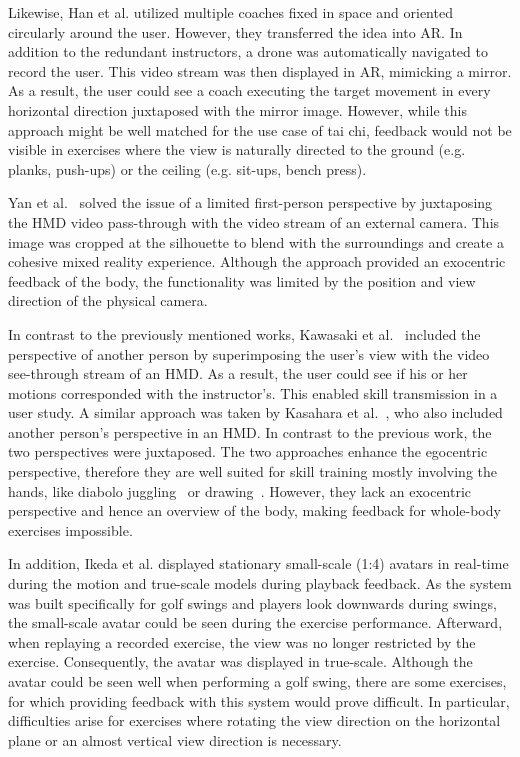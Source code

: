 Likewise, Han et al.\cite{han2017mtc} utilized multiple coaches fixed in space and oriented circularly around the user. However, they transferred the idea into AR. In addition to the redundant instructors, a drone was automatically navigated to record the user. This video stream was then displayed in AR, mimicking a mirror. As a result, the user could see a coach executing the target movement in every horizontal direction juxtaposed with the mirror image. However, while this approach might be well matched for the use case of tai chi, feedback would not be visible in exercises where the view is naturally directed to the ground (e.g. planks, push-ups) or the ceiling (e.g. sit-ups, bench press).

Yan et al.~\cite{Yan2015oma} solved the issue of a limited first-person perspective by juxtaposing the HMD video pass-through with the video stream of an external camera. This image was cropped at the silhouette to blend with the surroundings and create a cohesive mixed reality experience. Although the approach provided an exocentric feedback of the body, the functionality was limited by the position and view direction of the physical camera.

In contrast to the previously mentioned works, Kawasaki et al.~\cite{kawasaki2010cst} included the perspective of another person by superimposing the user's view with the video see-through stream of an HMD. As a result, the user could see if his or her motions corresponded with the instructor's. This enabled skill transmission in a user study. A similar approach was taken by Kasahara et al.~\cite{kasahara2016pe}, who also included another person's perspective in an HMD. In contrast to the previous work, the two perspectives were juxtaposed. The two approaches enhance the egocentric perspective, therefore they are well suited for skill training mostly involving the hands, like diabolo juggling~\cite{kawasaki2010cst} or drawing~\cite{kasahara2016pe}. However, they lack an exocentric perspective and hence an overview of the body, making feedback for whole-body exercises impossible.



In addition, Ikeda et al. \cite{ikeda2018arb} displayed stationary small-scale (1:4) avatars in real-time during the motion and true-scale models during playback feedback. As the system was built specifically for golf swings and players look downwards during swings, the small-scale avatar could be seen during the exercise performance. Afterward, when replaying a recorded exercise, the view was no longer restricted by the exercise. Consequently, the avatar was displayed in true-scale. Although the avatar could be seen well when performing a golf swing, there are some exercises, for which providing feedback with this system would prove difficult. In particular, difficulties arise for exercises where rotating the view direction on the horizontal plane or an almost vertical view direction is necessary.

